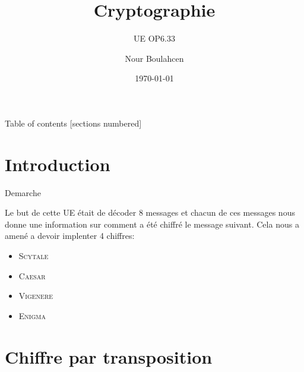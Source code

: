 \documentclass[10pt]{beamer}
\title{Cryptographie}
\subtitle{UE OP6.33}
\date{\today}
\author{Nour Boulahcen}
\institute{Institut Villebon Georges Charpak}
\begin{document}
\maketitle

\begin{frame}{Table of contents}
  [sections numbered]
  \tableofcontents%
\end{frame}

\section{Introduction}

\begin{frame}[fragile]{Demarche}

  Le but de cette UE était de décoder 8 messages et chacun de ces messages nous donne une information sur comment a été chiffré le message suivant. Cela nous a amené a devoir implenter 4 chiffres: 
  \begin{itemize}
      \item \textsc{Scytale}
      \item \textsc{Caesar}
      \item \textsc{Vigenere}
      \item \textsc{Enigma}
  \end{itemize}
\end{frame}


\section[Chiffre par transposition - \large{\texttt{\textit{Scytale}}}]{Chiffre par transposition}
\end{document}
